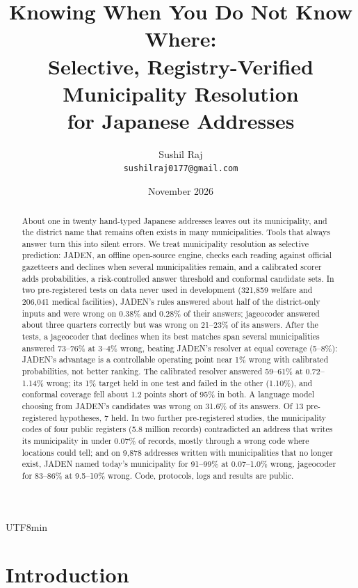 \documentclass[10pt]{article}
\title{Knowing When You Do Not Know Where:\\Selective, Registry-Verified Municipality Resolution\\for Japanese Addresses}
\author{Sushil Raj\\\texttt{sushilraj0177@gmail.com}}
\date{November 2026}
\begin{document}
\begin{CJK}{UTF8}{min}
\maketitle

\begin{abstract}
About one in twenty hand-typed Japanese addresses leaves out its municipality, and the district name
that remains often exists in many municipalities. Tools that always answer turn this into silent
errors. We treat municipality resolution as selective prediction: JADEN, an offline open-source
engine, checks each reading against official gazetteers and declines when several municipalities
remain, and a calibrated scorer adds probabilities, a risk-controlled answer threshold and conformal
candidate sets. In two pre-registered tests on data never used in development (321,859 welfare and
206,041 medical facilities), JADEN's rules answered about half of the district-only inputs and were
wrong on 0.38\% and 0.28\% of their answers; jageocoder answered about three quarters correctly but
was wrong on 21--23\% of its answers. After the tests, a jageocoder that declines when its best matches
span several municipalities answered 73--76\% at 3--4\% wrong, beating JADEN's resolver at equal coverage
(5--8\%): JADEN's advantage is a controllable operating point near 1\% wrong with calibrated
probabilities, not better ranking. The calibrated resolver answered 59--61\% at
0.72--1.14\% wrong; its 1\% target held in one test and failed in the other (1.10\%), and conformal
coverage fell about 1.2 points short of 95\% in both. A language model choosing from JADEN's
candidates was wrong on 31.6\% of its answers. Of 13 pre-registered hypotheses, 7 held. In two further
pre-registered studies, the municipality codes of four public registers (5.8 million records) contradicted
an address that writes its municipality in under 0.07\% of records, mostly through a wrong code
where locations could tell; and on 9,878 addresses written with municipalities that no longer
exist, JADEN named today's municipality for 91--99\% at 0.07--1.0\% wrong, jageocoder for 83--86\% at
9.5--10\% wrong. Code, protocols, logs and results are public.
\end{abstract}

\section{Introduction}


\end{CJK}
\end{document}

